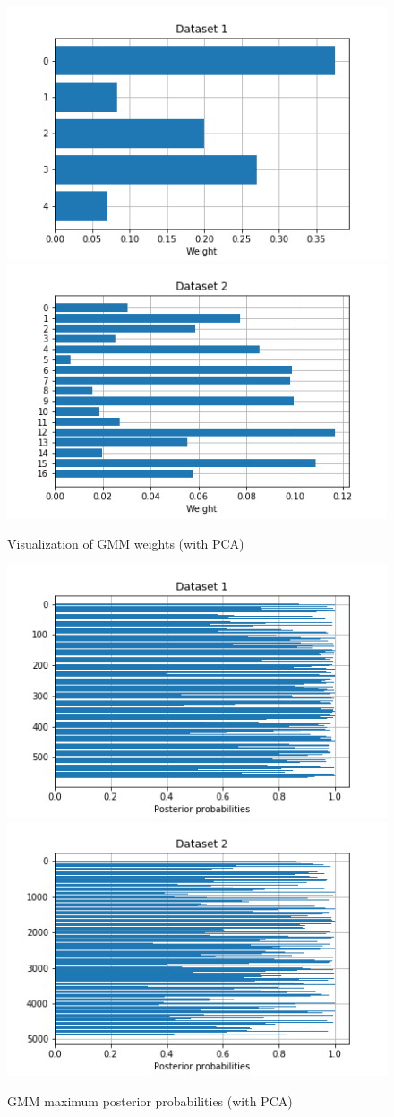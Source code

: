 \documentclass[letterpaper]{article}
\begin{document}
	\begin{figure}
		\centering
		\begin{minipage}{.48\textwidth}
			\centering
			\includegraphics[width=.5\linewidth]{../../plots/pca_gmm_wts_1}%
			\centering
			\includegraphics[width=.5\linewidth]{../../plots/pca_gmm_wts_2}
			\caption{Visualization of GMM weights (with PCA)}
			\label{fig:pca_gmm_wts_viz}
		\end{minipage}%
		\hfill
		\begin{minipage}{.48\textwidth}
			\centering
			\includegraphics[width=.5\linewidth]{../../plots/pca_gmm_probs_1}%
			\centering
			\includegraphics[width=.5\linewidth]{../../plots/pca_gmm_probs_2}
			\caption{GMM maximum posterior probabilities (with PCA)}
			\label{fig:pca_gmm_probs_viz}
		\end{minipage}%
	\end{figure}
\end{document}
